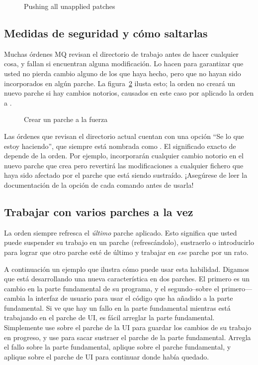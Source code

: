 \begin{figure}[ht]
  \caption{Pushing all unapplied patches}
  \label{ex:mq:qpush-a}
\end{figure}

\subsection{Medidas de seguridad y cómo saltarlas}

Muchas órdenes MQ revisan el directorio de trabajo antes de hacer
cualquier cosa, y fallan si encuentran alguna modificación.  Lo hacen
para garantizar que usted no pierda cambio alguno de los que haya
hecho, pero que no hayan sido incorporados en algún parche.  La
figura~\ref{ex:mq:add} ilusta esto; la orden  no
creará un nuevo parche si hay cambios notorios, causados en este caso
por aplicado la orden  a .

\begin{figure}[ht]
  \caption{Crear un parche a la fuerza}
  \label{ex:mq:add}
\end{figure}

Las órdenes que revisan el directorio actual cuentan con una opción
``Se lo que estoy haciendo'', que siempre está nombrada como
.  El significado exacto de  depende de la
orden.  Por ejemplo, 
incorporarán cualquier cambio notorio en el nuevo parche que crea pero
 revertirá las modificaciones a
cualquier fichero que haya sido afectado por el parche que está siendo
sustraído. ¡Asegúrese de leer la documentación de la opción 
de cada comando antes de usarla!

\subsection{Trabajar con varios parches a la vez}

La orden  siempre refresca el \emph{último}
parche aplicado.  Esto significa que usted puede suspender su trabajo
en un parche (refrescándolo), sustraerlo o introducirlo para lograr
que otro parche esté de último y trabajar en \emph{ese} parche por un
rato.

A continuación un ejemplo que ilustra cómo puede usar esta habilidad.
Digamos que está desarrollando una nueva característica en dos
parches.  El primero es un cambio en la parte fundamental de su
programa, y el segundo--sobre el primero---cambia la interfaz de
usuario para usar el código que ha añadido a la parte fundamental.  Si
ve que hay un fallo en la parte fundamental mientras está trabajando
en el parche de UI, es fácil arreglar la parte fundamental.
Simplemente use  sobre el parche de la UI para
guardar los cambios de su trabajo en progreso, y use 
para sacar sustraer el parche de la parte fundamental.  Arregla el
fallo sobre la parte fundamental, aplique  sobre
el parche fundamental, y aplique  sobre el parche de
UI para continuar donde había quedado.

